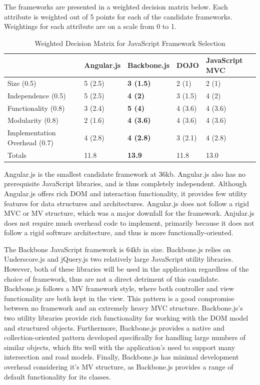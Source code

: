 \documentclass{report}
\begin{document}
The frameworks are presented in a weighted decision matrix below. Each attribute is weighted out of 5 points for each of the candidate frameworks. Weightings for each attribute are on a scale from 0 to 1.

\begin{table}
\centering
    \begin{tabular}{l|llll}
    ~                             & Angular.js & \textbf{Backbone.js} & DOJO    & JavaScript MVC \\ \hline
    Size (0.5)                    & 5 (2.5)    & \textbf{3 (1.5)}     & 2 (1)   & 2 (1)        \\
    Independence (0.5)            & 5 (2.5)    & \textbf{4 (2)}       & 3 (1.5)   & 4 (2)          \\
    Functionality (0.8)           & 3 (2.4)    & \textbf{5 (4)}       & 4 (3.6)   & 4 (3.6)          \\
    Modularity (0.8)              & 2 (1.6)    & \textbf{4 (3.6)}     & 4 (3.6) & 4 (3.6)        \\
    Implementation Overhead (0.7) & 4 (2.8)    & \textbf{4 (2.8)}     & 3 (2.1) & 4 (2.8)        \\ \hline
    Totals                        & 11.8       & \textbf{13.9}        & 11.8    & 13.0           \\
    \end{tabular}
\caption{Weighted Decision Matrix for JavaScript Framework Selection}
\label{table:framework-matrix}
\end{table}

Angular.js is the smallest candidate framework at 36kb. Angular.js also has no prerequisite JavaScript libraries, and is thus completely independent. Although Angular.js offers rich DOM and interaction functionality, it provides few utility features for data structures and architectures. Angular.js does not follow a rigid MVC or MV structure, which was a major downfall for the framework. Anjular.js does not require much overhead code to implement, primarily because it does not follow a rigid software architecture, and thus is more functionally-oriented.

The Backbone JavaScript framework is 64kb in size. Backbone.js relies on Underscore.js and jQuery.js two relatively large JavaScript utility libraries. However, both of these libraries will be used in the application regardless of the choice of framework, thus are not a direct detriment of this candidate. Backbone.js follows a MV framework style, where both controller and view functionality are both kept in the view. This pattern is a good compromise between no framework and an extremely heavy MVC structure. Backbone.js's two utility libraries provide rich functionality for working with the DOM model and structured objects. Furthermore, Backbone.js provides a native and collection-oriented pattern developed specifically for handling large numbers of similar objects, which fits well with the application's need to support many intersection and road models. Finally, Backbone.js has minimal development overhead considering it's MV structure, as Backbone.js provides a range of default functionality for its classes.
\end{document}
